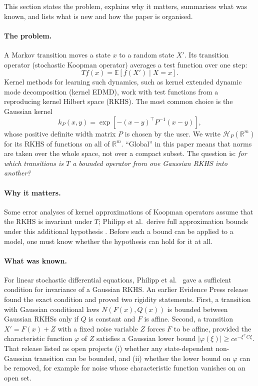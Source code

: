 \documentclass[11pt,a4paper]{article}
\theoremstyle{remark}
\newcommand{\R}{\mathbb R}
\newcommand{\E}{\mathbb E}
\newcommand{\HH}{\mathcal H}
\begin{document}
This section states the problem, explains why it matters, summarises
what was known, and lists what is new and how the paper is organised.

\paragraph{The problem.}
A Markov transition moves a state $x$ to a random state $X'$. Its
transition operator (stochastic Koopman operator) averages a test
function over one step:
\[
 Tf(x)=\E[f(X')\mid X=x].
\]
Kernel methods for learning such dynamics, such as kernel extended
dynamic mode decomposition (kernel EDMD), work with test functions from
a reproducing kernel Hilbert space (RKHS). The most common choice is the
Gaussian kernel
\[
 k_P(x,y)=\exp[-(x-y)^\top P^{-1}(x-y)],
\]
whose positive definite width matrix $P$ is chosen by the user. We write
$\HH_P(\R^m)$ for its RKHS of functions on all of $\R^m$. ``Global'' in
this paper means that norms are taken over the whole space, not over a
compact subset. The question is: \emph{for which transitions is $T$ a
bounded operator from one Gaussian RKHS into another?}

\paragraph{Why it matters.}
Some error analyses of kernel approximations of Koopman operators assume
that the RKHS is invariant under $T$; Philipp et al.\ derive full
approximation bounds under this additional hypothesis \cite{Philipp2024}.
Before such a bound can be applied to a model, one must know whether the
hypothesis can hold for it at all.

\paragraph{What was known.}
For linear stochastic differential equations, Philipp et al.\
\cite{Philipp2025} gave a sufficient condition for invariance of a
Gaussian RKHS. An earlier Evidence Press release \cite{Evidence2026}
found the exact condition and proved two rigidity statements. First, a
transition with Gaussian conditional laws $N(F(x),Q(x))$ is bounded
between Gaussian RKHSs only if $Q$ is constant and $F$ is affine. Second,
a transition $X'=F(x)+Z$ with a fixed noise variable $Z$ forces $F$ to be
affine, provided the characteristic function $\varphi$ of $Z$ satisfies
a Gaussian lower bound $|\varphi(\xi)|\ge ce^{-\xi^\top C\xi}$. That
release listed as open projects (i) whether any state-dependent
non-Gaussian transition can be bounded, and (ii) whether the lower bound
on $\varphi$ can be removed, for example for noise whose characteristic
function vanishes on an open set.
\end{document}
